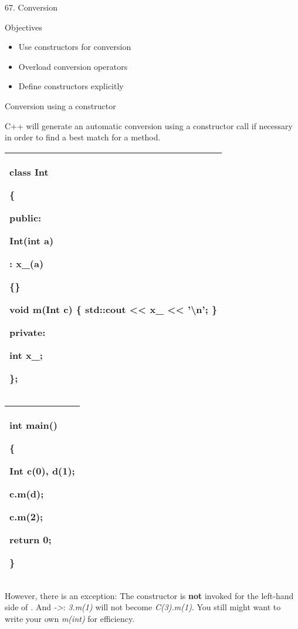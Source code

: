\documentclass[
]{article}
\author{}
\date{}
\providecommand{\tightlist}{%
  \setlength{\itemsep}{0pt}\setlength{\parskip}{0pt}}
\begin{document}
67. Conversion

Objectives

\begin{itemize}
\tightlist
\item
  Use constructors for conversion
\item
  Overload conversion operators
\item
  Define constructors explicitly
\end{itemize}

Conversion using a constructor

C++ will generate an automatic conversion using a constructor call if
necessary in order to find a best match for a method.

\begin{longtable}[]{@{}l@{}}
\toprule
\endhead
\begin{minipage}[t]{0.97\columnwidth}\raggedright
class Int

\{

public:

Int(int a)

: x\_(a)

\{\}

void m(Int c) \{ std::cout \textless\textless{} x\_ \textless\textless{}
'\textbackslash n'; \}

private:

int x\_;

\}; \strut
\end{minipage}\tabularnewline
\bottomrule
\end{longtable}

\begin{longtable}[]{@{}l@{}}
\toprule
\endhead
\begin{minipage}[t]{0.97\columnwidth}\raggedright
int main()

\{

Int c(0), d(1);

c.m(d);

\textbf{c.m(2);}

return 0;

\}\strut
\end{minipage}\tabularnewline
\bottomrule
\end{longtable}

However, there is an exception: The constructor is \textbf{not} invoked
for the left-hand side of \emph{.} And \emph{-\textgreater{}}:
\emph{3.m(1)} will not become \emph{C(3).m(1)}. You still might want to
write your own \emph{m(int)} for efficiency.
\end{document}
